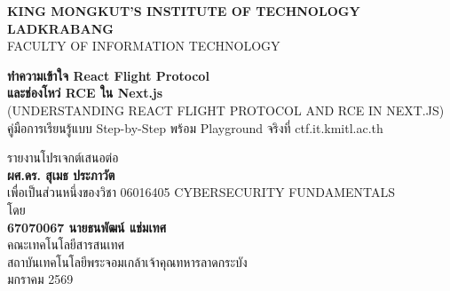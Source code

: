 \documentclass[12pt,oneside]{report}
\begin{document}
\begin{titlepage}
    \centering
    \vspace*{1cm}
    {\large \textbf{KING MONGKUT'S INSTITUTE OF TECHNOLOGY LADKRABANG}} \\
    {\large FACULTY OF INFORMATION TECHNOLOGY} \\
    \vspace{2.5cm}
    \begin{minipage}{0.9\textwidth}
        \centering
        {\Huge \textbf{ทำความเข้าใจ React Flight Protocol \\ และช่องโหว่ RCE ใน Next.js}} \\
        \vspace{0.6cm}
        {\large (UNDERSTANDING REACT FLIGHT PROTOCOL AND RCE IN NEXT.JS)} \\
        \vspace{0.4cm}
        {\large คู่มือการเรียนรู้แบบ Step-by-Step พร้อม Playground จริงที่ ctf.it.kmitl.ac.th}
    \end{minipage}
    \vspace{2.5cm}
    {\large รายงานโปรเจกต์เสนอต่อ} \\
    {\large \textbf{ผศ.ดร. สุเมธ ประภาวัต}} \\
    {\large เพื่อเป็นส่วนหนึ่งของวิชา 06016405 CYBERSECURITY FUNDAMENTALS} \\
    \vspace{1.5cm}
    {\large โดย} \\
    \vspace{0.3cm}
    {\Large \textbf{67070067 นายธนพัฒน์ แช่มเทศ}} \\
    \vfill
    {\large คณะเทคโนโลยีสารสนเทศ} \\
    {\large สถาบันเทคโนโลยีพระจอมเกล้าเจ้าคุณทหารลาดกระบัง} \\
    {\large มกราคม 2569} \\
    \vspace{0.5cm}
\end{titlepage}

\tableofcontents
\clearpage
\listoffigures
\clearpage
\listoftables

\clearpage
{}
{}
\end{document}
